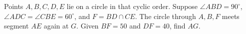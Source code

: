 Points $A,B,C,D,E$ lie on a circle in that cyclic order. Suppose $\angle ABD=90^\circ$, $\angle ADC=\angle CBE=60^\circ$, and $F=BD\cap CE$. The circle through $A,B,F$ meets segment $AE$ again at $G$. Given $BF=50$ and $DF=40$, find $AG$.
